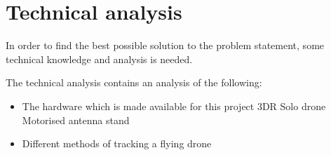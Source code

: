 \chapter{Technical analysis} \label{ch:TechnicalKnowlegde}
In order to  find the best possible solution to the problem statement, some technical knowledge and analysis is needed. 

The technical analysis contains an analysis of the following: 
\begin{itemize}
\item The hardware which is made available for this project
\subitem 3DR Solo drone 
\subitem Motorised antenna stand 

\item Different methods of tracking a flying drone
\end{itemize}
 

%





\graphicspath{{figures/technical/}}


%
